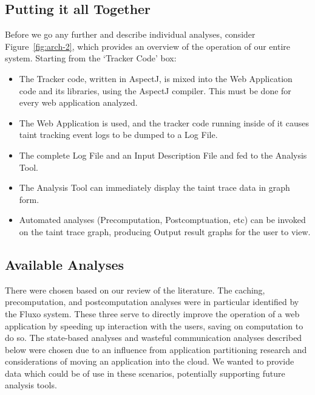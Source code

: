 \documentclass[msc,oneside]{ubcthesis}
\begin{document}
\subsection{Putting it all Together}
Before we go any further and describe individual analyses, consider Figure~\ref{fig:arch-2}, which provides an overview of the operation of our entire system. Starting from the `Tracker Code' box:
\begin{itemize}
\item The Tracker code, written in AspectJ, is mixed into the Web Application code and its libraries, using the AspectJ compiler. This must be done for every web application analyzed.
\item The Web Application is used, and the tracker code running inside of it causes taint tracking event logs to be dumped to a Log File.
\item The complete Log File and an Input Description File and fed to the Analysis Tool.
\item The Analysis Tool can immediately display the taint trace data in graph form.
\item Automated analyses (Precomputation, Postcomptuation, etc) can be invoked on the taint trace graph, producing Output result graphs for the user to view.
\end{itemize}

\subsection{Available Analyses}

There were chosen based on our review of the literature. The caching, precomputation, and postcomputation analyses were in particular identified by the Fluxo \cite{Kiciman2010} system. These three serve to directly improve the operation of a web application by speeding up interaction with the users, saving on computation to do so. The state-based analyses and wasteful communication analyses described below were chosen due to an influence from application partitioning research and considerations of moving an application into the cloud. We wanted to provide data which could be of use in these scenarios, potentially supporting future analysis tools.
\end{document}
